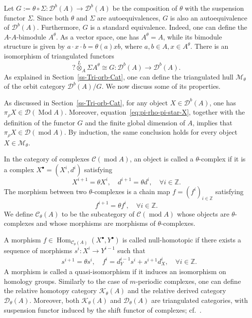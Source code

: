 \documentclass[12pt,reqno]{amsart}
\numberwithin{equation}{section}
\renewcommand{\mod}{\operatorname{mod}\nolimits}
\newcommand{\Mod}{\operatorname{Mod}\nolimits}
\newcommand{\Hom}{\operatorname{Hom}\nolimits}
\begin{document}
	Let
	$G:=\theta\circ \Sigma:\mathcal{D}^{b}(A)\rightarrow \mathcal{D}^{b}(A)$
	be the composition of $\theta$ with the suspension functor $\Sigma$. Since both
	$\theta$ and $\Sigma$ are autoequivalences, $G$ is also an autoequivalence of
	$\mathcal{D}^{b}(A)$. Furthermore, $G$ is a standard equivalence. Indeed,
	one can define the $A$-$A$-bimodule $A^{\theta}$. As a vector space, one has
	$A^{\theta}=A$, while its bimodule structure is given by
	$a\cdot x\cdot b=\theta(a)xb$, where $a,b\in A,x\in A^{\theta}.$
	There is an isomorphism of triangulated functors
	\[
	? \stackrel{L}{\otimes}_{A} \Sigma A^{\theta}\cong G
	:\mathcal{D}^{b}(A)\longrightarrow \mathcal{D}^{b}(A).  
	\]
	As explained in Section~\ref{ss-Tri-orb-Cat}, one can define the
	triangulated hull $\mathcal{M}_{\theta}$ of the orbit category
	$\mathcal{D}^{b}(A)/G$. We now discuss some of its properties.
	
	As discussed in Section~\ref{ss-Tri-orb-Cat}, for any object $X\in \mathcal{D}^b(A)$, one has $\pi_\rho X\in \mathcal{D}(\Mod A)$. Moreover, equation~\eqref{eq:pi-rho-pi-star-X}, together with the definition of the functor $G$ and the finite global dimension of $A$, implies that 
	$\pi_\rho X\in \mathcal{D}(\mod A)$. By induction, the same conclusion holds for every object 
	$X\in \mathcal M_\theta$.
	
	In the category of complexes $\mathcal{C}(\mod A)$, an object is called
	a $\theta$-complex if it is a complex
	$X^{\bullet}=(X^i,d^i)$ satisfying
	\[
	X^{i+1}=\theta X^i,
	\quad
	d^{i+1}=\theta d^i, \quad
	\forall  i\in \mathbb{Z}.
	\]
	The morphism between two $\theta$-complexes is a chain map $f=(f^i)_{i\in\mathbb{Z}}$ satisfying
	\[
	f^{i+1}=\theta f^i,\quad \forall i\in \mathbb{Z}.
	\]
	We define $\mathcal{C}_{\theta}(A)$ to be the
	subcategory of $\mathcal{C}(\mod A)$ whose objects are $\theta$-complexes
	and whose morphisms are morphisms of $\theta$-complexes.
	
	A morphism $f\in \Hom_{\mathcal{C}_{\theta}(A)}(X^\bullet,Y^\bullet)$ is
	called null-homotopic if there exists a sequence of morphisms
	$s^i:X^i\rightarrow Y^{i-1}$ such that
	\begin{align*}
		&s^{i+1}=\theta s^i,
		\quad f^i= d_Y^{i-1}s^i+s^{i+1} d_X^i , \quad \forall i\in\mathbb{Z}.
	\end{align*}
	A morphism is called a quasi-isomorphism if it induces an isomorphism on
	homology groups. Similarly to the case of $m$-periodic complexes, one can define
	the relative homotopy category $\mathcal{K}_{\theta}(A)$ and the relative
	derived category $\mathcal{D}_{\theta}(A)$. Moreover, both
	$\mathcal{K}_{\theta}(A)$ and $\mathcal{D}_{\theta}(A)$ are triangulated
	categories, with suspension functor induced by the shift functor of complexes;
	cf.~\cite{Hap88,PX97-Root-cat-simple-Lie,Sta18}.
	
\end{document}

